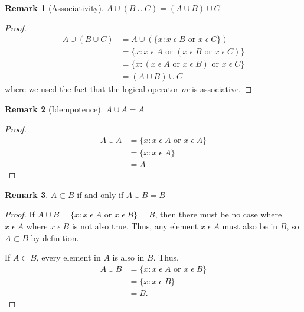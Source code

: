 \documentclass[12pt]{article}
\newtheorem{remark}{Remark}
\begin{document}
\begin{remark}[Associativity]
    $A \cup (B \cup C) = (A \cup B) \cup C$
\end{remark}
\begin{proof}
    \begin{align*}
        A \cup (B \cup C) &= A \cup (\{x: x\;\epsilon\;B \text{ or } x\;\epsilon\;C\})\\
                          &= \{x: x\;\epsilon\;A \text{ or } (x\;\epsilon\;B \text{ or } x\;\epsilon\;C)\}\\
                          &= \{x: (x\;\epsilon\;A \text{ or } x\;\epsilon\;B) \text{ or } x\;\epsilon\;C\}\\
                          &= (A \cup B) \cup C
    \end{align*}
    where we used the fact that the logical operator \textit{or} is associative.
\end{proof}

\begin{remark}[Idempotence]
    $A \cup A = A$
\end{remark}
\begin{proof}
    \begin{align*}
        A \cup A &= \{x: x\;\epsilon\;A \text{ or } x\;\epsilon\;A\}\\
                 &= \{x: x\;\epsilon\;A\}\\\
                 &= A
    \end{align*}
\end{proof}

\begin{remark}
    $A \subset B \text{ if and only if } A \cup B = B$
\end{remark}
\begin{proof}
    If $A \cup B = \{x: x\;\epsilon\;A\text{ or } x\;\epsilon\;B\} = B$, then there must be no case
    where $x\;\epsilon\;A$ where $x\;\epsilon\;B$ is not also true.
    Thus, any element $x\;\epsilon\;A$ must also be in $B$, so $A \subset B$ by definition.

    If $A\subset B$, every element in $A$ is also in $B$. Thus,
    \begin{align*}
        A \cup B &= \{x: x\;\epsilon\;A\text{ or } x\;\epsilon\;B\}\\
                 &= \{x: x\;\epsilon\;B\}\\
                 &= B.
    \end{align*}
\end{proof}
\end{document}
